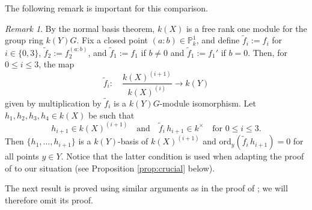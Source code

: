 \documentclass{amsart}
\numberwithin{equation}{section}
\numberwithin{table}{section}
\theoremstyle{plain}
\theoremstyle{definition}
\theoremstyle{remark}
\newtheorem{remark}[theorem]{Remark}
\begin{document}
The following remark is important for this comparison.

\begin{remark}
\label{rem:important}
By the normal basis theorem, $k(X)$ is a free rank one module for the group ring $k(Y)G$. Fix a closed point $(a:b)\in \mathbb{P}^1_k$, and define $\widetilde{f}_i:=f_i$ for $i\in\{0,3\}$, $\widetilde{f}_2:=f_2^{(a:b)}$, and $\widetilde{f}_1:=f_1$ if $b\ne 0$ and $\widetilde{f}_1:=f_1'$ if $b=0$. Then, for $0\le i\le 3$, the map
\begin{equation}
\label{eq:map!}
\widetilde{f}_i: \quad \frac{k(X)^{(i+1)}}{k(X)^{(i)}} \to k(Y)
\end{equation}
given by multiplication by $\widetilde{f}_i$ is a $k(Y)G$-module isomorphism. Let $h_1,h_2,h_3,h_4\in k(X)$ be such that
\begin{equation}
\label{eq:basiscondition}
h_{i+1}\in k(X)^{(i+1)} \quad\mbox{and}\quad \widetilde{f}_i\,h_{i+1}\in k^\times\quad\mbox{for $0\le i\le 3$.}
\end{equation}
Then $\{h_1,\ldots,h_{i+1}\}$ is a $k(Y)$-basis of $k(X)^{(i+1)}$ and $\mathrm{ord}_y(\widetilde{f}_i\,h_{i+1})=0$ for all points $y\in Y$. 
Notice that the latter condition is used when adapting the proof of \cite[Proposition 4.1]{BleherChinburgKontogeorgis2020} to our situation (see Proposition \ref{prop:crucial} below).
\end{remark}

The next result is proved using similar arguments as in the proof of \cite[Proposition 4.1]{BleherChinburgKontogeorgis2020}; we will therefore omit its proof.
\end{document}
